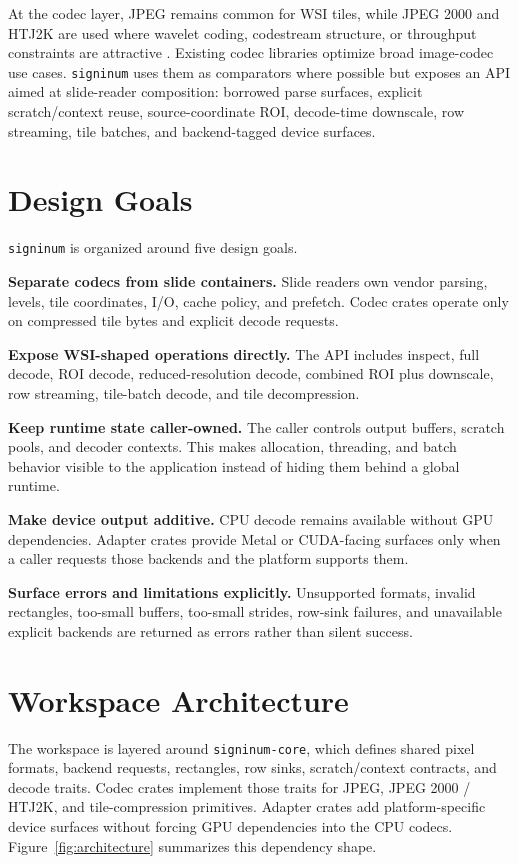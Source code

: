 \documentclass[11pt]{article}
\newcommand{\signinum}{\texttt{signinum}}
\newcommand{\crate}[1]{\texttt{#1}}
\begin{document}
At the codec layer, JPEG remains common for WSI tiles, while JPEG 2000 and
HTJ2K are used where wavelet coding, codestream structure, or throughput
constraints are attractive \citep{iso15444_15,taubman2019fbcot}. Existing
codec libraries optimize broad image-codec use cases. \signinum{} uses them as
comparators where possible but exposes an API aimed at slide-reader
composition: borrowed parse surfaces, explicit scratch/context reuse,
source-coordinate ROI, decode-time downscale, row streaming, tile batches, and
backend-tagged device surfaces.

\section{Design Goals}

\signinum{} is organized around five design goals.

\textbf{Separate codecs from slide containers.} Slide readers own vendor
parsing, levels, tile coordinates, I/O, cache policy, and prefetch. Codec crates
operate only on compressed tile bytes and explicit decode requests.

\textbf{Expose WSI-shaped operations directly.} The API includes inspect,
full decode, ROI decode, reduced-resolution decode, combined ROI plus
downscale, row streaming, tile-batch decode, and tile decompression.

\textbf{Keep runtime state caller-owned.} The caller controls output buffers,
scratch pools, and decoder contexts. This makes allocation, threading, and
batch behavior visible to the application instead of hiding them behind a
global runtime.

\textbf{Make device output additive.} CPU decode remains available without GPU
dependencies. Adapter crates provide Metal or CUDA-facing surfaces only when a
caller requests those backends and the platform supports them.

\textbf{Surface errors and limitations explicitly.} Unsupported formats,
invalid rectangles, too-small buffers, too-small strides, row-sink failures,
and unavailable explicit backends are returned as errors rather than silent
success.

\section{Workspace Architecture}

The workspace is layered around \crate{signinum-core}, which defines shared
pixel formats, backend requests, rectangles, row sinks, scratch/context
contracts, and decode traits. Codec crates implement those traits for JPEG,
JPEG 2000 / HTJ2K, and tile-compression primitives. Adapter crates add
platform-specific device surfaces without forcing GPU dependencies into the
CPU codecs. Figure~\ref{fig:architecture} summarizes this dependency shape.
\end{document}
